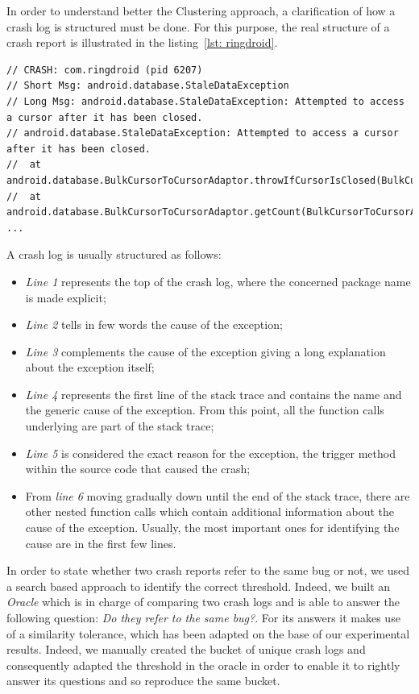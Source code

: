 In order to understand better the Clustering approach, a clarification of how a crash log is structured must be done. 
For this purpose, the real structure of a crash report is illustrated in the listing~\ref{lst: ringdroid}. 
\begin{lstlisting}[caption=Structure of a crash log, basicstyle=\fontsize{6}{8}\ttfamily,label={lst: ringdroid}]
// CRASH: com.ringdroid (pid 6207)
// Short Msg: android.database.StaleDataException
// Long Msg: android.database.StaleDataException: Attempted to access a cursor after it has been closed.
// android.database.StaleDataException: Attempted to access a cursor after it has been closed.
// 	at android.database.BulkCursorToCursorAdaptor.throwIfCursorIsClosed(BulkCursorToCursorAdaptor.java:64)
// 	at android.database.BulkCursorToCursorAdaptor.getCount(BulkCursorToCursorAdaptor.java:70)
...
\end{lstlisting}
A crash log is usually structured as follows: 
\begin{itemize}
\item \textit{Line 1} represents the top of the crash log, where the concerned package name is made explicit;
\item \textit{Line 2} tells in few words the cause of the exception; 
\item \textit{Line 3} complements the cause of the exception giving a long explanation about the exception itself;
\item \textit{Line 4} represents the first line of the stack trace and contains the name and the generic cause of the exception. 
From this point, all the function calls underlying are part of the stack trace;
\item \textit{Line 5} is considered the exact reason for the exception, \ie the trigger method within the source code that caused the crash;
\item From \textit{line 6} moving gradually down until the end of the stack trace, there are other nested function calls which contain additional information about the cause of the exception. Usually, the most important ones for identifying the cause are in the first few lines. 
\end{itemize}
In order to state whether two crash reports refer to the same bug or not, we used a search based approach to identify the correct threshold. 
Indeed, we built an \textit{Oracle} which is in charge of comparing two crash logs and is able to answer the following question: \textit{Do they refer to the same bug?}. 
For its answers it makes use of a similarity tolerance, which has been adapted on the base of our experimental results. 
Indeed, we manually created the bucket of unique crash logs and consequently adapted the threshold in the oracle in order to enable it to rightly answer its questions and so reproduce the same bucket. 

